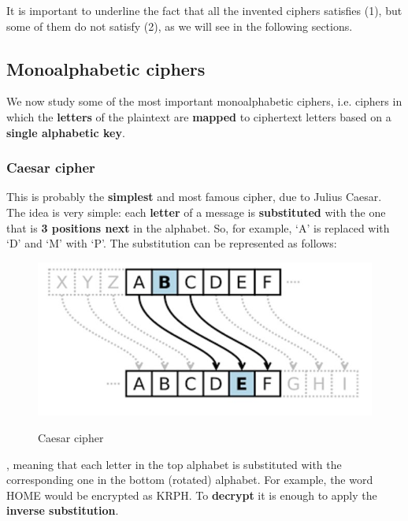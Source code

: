 It is important to underline the fact that all the invented ciphers satisfies (1), but some of them do not satisfy (2), as we will see in the following sections.

\subsection{Monoalphabetic ciphers}
We now study some of the most important monoalphabetic ciphers, i.e. ciphers in which the \textbf{letters} of the plaintext are \textbf{mapped} to ciphertext letters based on a \textbf{single alphabetic key}.

\subsubsection{Caesar cipher}
This is probably the \textbf{simplest} and most famous cipher, due to Julius Caesar. The idea is very simple: each \textbf{letter} of a message is \textbf{substituted} with the one that is \textbf{3 positions next} in the alphabet. So, for example, ‘A’ is replaced with ‘D’ and ‘M’ with ‘P’. The substitution can be represented as follows:

\begin{figure}[h!]
        \centering
        \includegraphics[scale = 1.2]{img/cl3.jpg}
        \label{cl3}
        \caption{Caesar cipher}
\end{figure}

, meaning that each letter in the top alphabet is substituted with the corresponding one in the bottom (rotated) alphabet. For example, the word HOME would be encrypted as KRPH. To \textbf{decrypt} it is enough to apply the \textbf{inverse substitution}.


